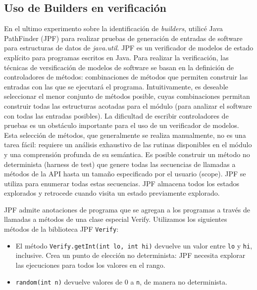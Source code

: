 




% 

\subsection{Uso de Builders en verificación}

En el ultimo experimento sobre la identificación de \emph{builders}, utilicé Java PathFinder \cite{Visser:2005} (JPF) para realizar pruebas de generación de entradas de software para estructuras de datos de \emph{java.util}. JPF  es un verificador de modelos de estado explícito para programas escritos en Java. Para realizar la verificación, las técnicas de versificación de modelos de software se basan en la definición de controladores de métodos: combinaciones de métodos que permiten construir las entradas con las que se ejecutará el programa. Intuitivamente, es deseable seleccionar el menor conjunto de métodos posible, cuyas combinaciones permitan construir todas las estructuras acotadas para el módulo (para analizar el software con todas las entradas posibles). La dificultad de escribir controladores de pruebas es un obstáculo importante para el uso de un verificador de modelos. Esta selección de métodos, que generalmente se realiza manualmente, no es una tarea fácil: requiere un análisis exhaustivo de las rutinas disponibles en el módulo y una comprensión profunda de su semántica.
Es posible construir un método no determinista (harness de test) que genere todas las secuencias de llamadas a métodos de la API hasta un tamaño especificado por el usuario (scope). JPF se utiliza para enumerar todas estas secuencias. JPF almacena todos los estados explorados y retrocede cuando visita un estado previamente explorado.

JPF admite anotaciones de programa que se agregan a los programas a través de llamadas a métodos de una clase especial Verify.
Utilizamos los siguientes métodos de la biblioteca JPF \verb"Verify":
\\
\begin{itemize}
\item El método \verb"Verify.getInt(int lo, int hi)" devuelve un valor entre \verb"lo" y \verb"hi", inclusive. Crea un punto de elección no determinista: JPF necesita explorar las ejecuciones para todos los valores en el rango.
\item \verb"random(int n)" devuelve valores de 0 a \verb"n", de manera no determinista.
\end{itemize}

